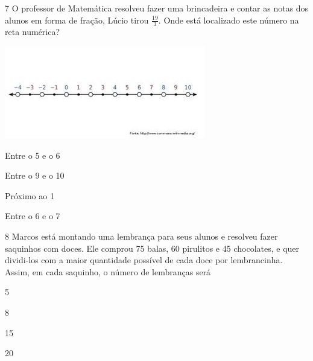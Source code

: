 \num{7} O professor de Matemática resolveu fazer uma brincadeira e contar as
notas dos alunos em forma de fração, Lúcio tirou $\frac{19}{3}$. Onde
está localizado este número na reta numérica?

\includegraphics{./imgSAEB_7_MAT/media/image109.png}

\begin{escolha}
\item Entre o 5 e o 6
\item Entre o 9 e o 10
\item Próximo ao 1
\item Entre o 6 e o 7
\end{escolha}




\num{8} Marcos está montando uma lembrança para seus alunos e resolveu fazer
saquinhos com doces. Ele comprou 75 balas, 60 pirulitos e 45 chocolates,
e quer dividi-los com a maior quantidade possível de cada doce por
lembrancinha. Assim, em cada saquinho, o número de lembranças será

\begin{escolha}
\item 5
\item 8
\item 15
\item 20
\end{escolha}


